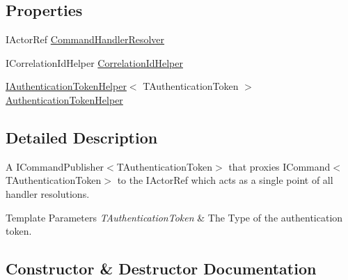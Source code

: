 \subsection*{Properties}
\begin{DoxyCompactItemize}
\item 
I\+Actor\+Ref \hyperlink{classCqrs_1_1Akka_1_1Commands_1_1AkkaCommandBusProxy_afab0340ffb172da48584dce148f3defd_afab0340ffb172da48584dce148f3defd}{Command\+Handler\+Resolver}
\item 
I\+Correlation\+Id\+Helper \hyperlink{classCqrs_1_1Akka_1_1Commands_1_1AkkaCommandBusProxy_aa554035c12060c7eedb0b982ac490da8_aa554035c12060c7eedb0b982ac490da8}{Correlation\+Id\+Helper}
\item 
\hyperlink{interfaceCqrs_1_1Authentication_1_1IAuthenticationTokenHelper}{I\+Authentication\+Token\+Helper}$<$ T\+Authentication\+Token $>$ \hyperlink{classCqrs_1_1Akka_1_1Commands_1_1AkkaCommandBusProxy_a6faae6227f1da33928e54a775466f9c9_a6faae6227f1da33928e54a775466f9c9}{Authentication\+Token\+Helper}
\end{DoxyCompactItemize}


\subsection{Detailed Description}
A I\+Command\+Publisher$<$\+T\+Authentication\+Token$>$ that proxies I\+Command$<$\+T\+Authentication\+Token$>$ to the I\+Actor\+Ref which acts as a single point of all handler resolutions. 


\begin{DoxyTemplParams}{Template Parameters}
{\em T\+Authentication\+Token} & The Type of the authentication token.\\
\hline
\end{DoxyTemplParams}


\subsection{Constructor \& Destructor Documentation}
\mbox{\label{classCqrs_1_1Akka_1_1Commands_1_1AkkaCommandBusProxy_ad9a3fa7aa546bc2c398d4f52d0659656_ad9a3fa7aa546bc2c398d4f52d0659656}} 
